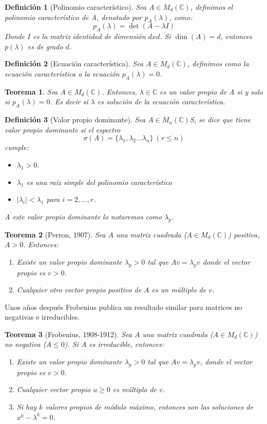 \documentclass[size=a4, parskip=half, titlepage=false, toc=flat, toc=bib, 12pt]{scrartcl}
\theoremstyle{theorem-style}
\newtheorem{nth}{Teorema}[section]
\theoremstyle{definition-style}
\newtheorem{ndef}{Definición}[section]
\theoremstyle{remark-style}
\theoremstyle{example-style}
\theoremstyle{definition-style}
\theoremstyle{remark-style}
\begin{document}
\begin{ndef}[Polinomio característico]
Sea $A \in M_d(\mathbb{C})$, definimos el polinomio característico de A, denotado por $p_A(\lambda)$, como:
$$p_A(\lambda) = \det (A - \lambda I) $$
Donde $I$ es la matriz identidad de dimensión $dxd$. Si $\dim(A) = d$, entonces $p(\lambda)$ es de grado $d$.
\end{ndef}
\begin{ndef}[Ecuación característica]
Sea $A \in M_d(\mathbb{C})$, definimos como la ecuación característica a la ecuación $p_A(\lambda) = 0$.
\end{ndef}

\begin{nth}
Sea $A \in M_d(\mathbb{C})$. Entonces, $\lambda \in \mathbb{C}$ es un valor propio de $A$ si y solo si $p_A(\lambda) = 0$. Es decir si $\lambda$ es solución de la ecuación característica.
\end{nth}

\begin{ndef}[Valor propio dominante]
Sea $A \in M_n(\mathbb{C})$S, se dice que tiene valor propio dominante si el espectro
$$\sigma (A) = \{ \lambda_1, \lambda_2 \dots \lambda_n \} \   (r \leq n)$$
cumple:
\begin{itemize}
\item $\lambda_1 > 0$.
\item $\lambda_1$ es una raíz simple del polinomio característico
\item $|\lambda_i| < \lambda_1$ para $i = 2, \dots , r$.
\end{itemize}
A este valor propio dominante lo notaremos como $\lambda_p$.
\end{ndef}

\begin{nth}[Perron, 1907]
Sea $A$ una matriz cuadrada ($A \in M_d(\mathbb{C})$) positiva, $A > 0$. Entonces:
\begin{enumerate}
\item Existe un valor propio dominante $\lambda_p > 0$ tal que $Av = \lambda_p v$ donde el vector propio es $v > 0$.
\item Cualquier otro vector propio positivo de $A$ es un múltiplo de $v$.
\end{enumerate}
\end{nth}

Unos años después Frobenius publica un resultado similar para matrices no negativas e irreducibles.

\begin{nth}[Frobenius, 1908-1912]
Sea $A $ una matriz cuadrada ($A \in M_d(\mathbb{C})$) no negativa ($A \leq 0$). Si $A$ es irreducible, entonces:
\begin{enumerate}
\item Existe un valor propio dominante $\lambda_p > 0$ tal que $A v = \lambda_p v$, donde el vector propio es
$v > 0$.
\item Cualquier vector propio $u \geq 0$ es múltiplo de $v$.
\item Si hay $k$ valores propios de módulo máximo, entonces son las soluciones de $x^k - \lambda^k = 0$.
\end{enumerate}
\end{nth}
\end{document}
